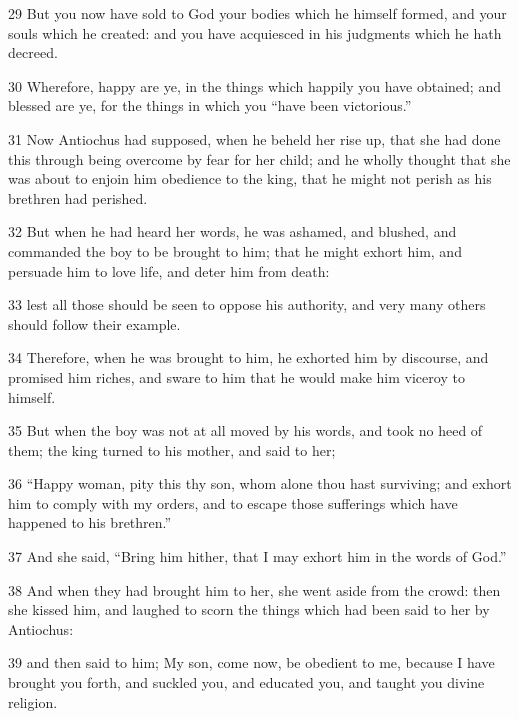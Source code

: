\par 29 But you now have sold to God your bodies which he himself formed, and your souls which he created: and you have acquiesced in his judgments which he hath decreed. 

\par 30 Wherefore, happy are ye, in the things which happily you have obtained; and blessed are ye, for the things in which you “have been victorious.” 

\par 31 Now Antiochus had supposed, when he beheld her rise up, that she had done this through being overcome by fear for her child; and he wholly thought that she was about to enjoin him obedience to the king, that he might not perish as his brethren had perished. 

\par 32 But when he had heard her words, he was ashamed, and blushed, and commanded the boy to be brought to him; that he might exhort him, and persuade him to love life, and deter him from death: 

\par 33 lest all those should be seen to oppose his authority, and very many others should follow their example. 

\par 34 Therefore, when he was brought to him, he exhorted him by discourse, and promised him riches, and sware to him that he would make him viceroy to himself. 

\par 35 But when the boy was not at all moved by his words, and took no heed of them; the king turned to his mother, and said to her; 

\par 36 “Happy woman, pity this thy son, whom alone thou hast surviving; and exhort him to comply with my orders, and to escape those sufferings which have happened to his brethren.” 

\par 37 And she said, “Bring him hither, that I may exhort him in the words of God.” 

\par 38 And when they had brought him to her, she went aside from the crowd: then she kissed him, and laughed to scorn the things which had been said to her by Antiochus: 

\par 39 and then said to him; My son, come now, be obedient to me, because I have brought you forth, and suckled you, and educated you, and taught you divine religion. 

